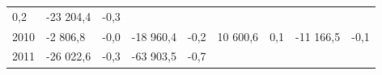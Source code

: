 \begin{longtable}[]{@{}lllllllll@{}}
\begin{minipage}[t]{0.06\columnwidth}
0,2\strut
\end{minipage} & \begin{minipage}[t]{0.09\columnwidth}\raggedright
-23 204,4\strut
\end{minipage} & \begin{minipage}[t]{0.06\columnwidth}\raggedright
-0,3\strut
\end{minipage}\tabularnewline
\begin{minipage}[t]{0.05\columnwidth}\raggedright
2010\strut
\end{minipage} & \begin{minipage}[t]{0.10\columnwidth}\raggedright
-2 806,8\strut
\end{minipage} & \begin{minipage}[t]{0.06\columnwidth}\raggedright
-0,0\strut
\end{minipage} & \begin{minipage}[t]{0.16\columnwidth}\raggedright
-18 960,4\strut
\end{minipage} & \begin{minipage}[t]{0.06\columnwidth}\raggedright
-0,2\strut
\end{minipage} & \begin{minipage}[t]{0.12\columnwidth}\raggedright
10 600,6\strut
\end{minipage} & \begin{minipage}[t]{0.06\columnwidth}\raggedright
0,1\strut
\end{minipage} & \begin{minipage}[t]{0.09\columnwidth}\raggedright
-11 166,5\strut
\end{minipage} & \begin{minipage}[t]{0.06\columnwidth}\raggedright
-0,1\strut
\end{minipage}\tabularnewline
\begin{minipage}[t]{0.05\columnwidth}\raggedright
2011\strut
\end{minipage} & \begin{minipage}[t]{0.10\columnwidth}\raggedright
-26 022,6\strut
\end{minipage} & \begin{minipage}[t]{0.06\columnwidth}\raggedright
-0,3\strut
\end{minipage} & \begin{minipage}[t]{0.16\columnwidth}\raggedright
-63 903,5\strut
\end{minipage} & \begin{minipage}[t]{0.06\columnwidth}\raggedright
-0,7\strut
\end{minipage} & \begin{minipage}[t]{0.12\columnwidth}\raggedright

\end{minipage}
\end{longtable}

